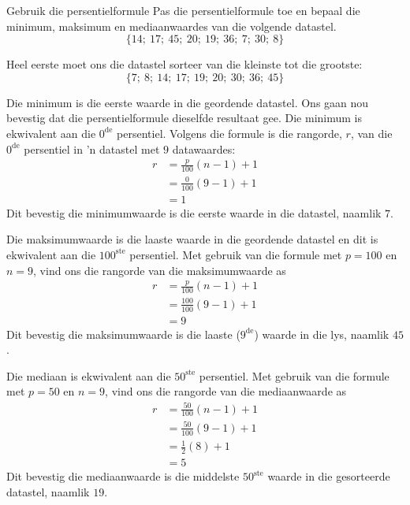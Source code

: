 \begin{wex}{Gebruik die persentielformule}
{Pas die persentielformule toe en bepaal die minimum, maksimum en mediaanwaardes van die volgende datastel. 
    \begin{equation*}
      \{14;\ 17;\ 45;\ 20;\ 19;\ 36;\ 7;\ 30;\ 8\}
    \end{equation*}
}{

  Heel eerste moet ons die datastel sorteer van die kleinste tot die grootste:
    \begin{equation*}
      \{7;\ 8;\ 14;\ 17;\ 19;\ 20;\ 30;\ 36;\ 45\}
    \end{equation*}


    Die minimum is die eerste waarde in die geordende datastel. Ons gaan nou bevestig dat die persentielformule dieselfde resultaat gee. Die minimum is ekwivalent aan die $0^{\mathrm{de}}$ persentiel. Volgens die formule is die rangorde, $r$, van die $0^{\mathrm{de}}$ persentiel in ’n datastel met $9$ datawaardes:
    \begin{align*}
      r &= \frac{p}{100}\left(n-1\right)+1 \\
        &= \frac{0}{100}\left(9-1\right)+1 \\
        &= 1
    \end{align*}
    Dit bevestig die minimumwaarde is die eerste waarde in die datastel, naamlik $7$.


    Die maksimumwaarde is die laaste waarde in die geordende datastel en dit is ekwivalent aan die $100^{\mathrm{ste}}$
    persentiel. Met gebruik van die formule met $p=100$ en $n=9$,
     vind ons die rangorde van die maksimumwaarde as
    \begin{align*}
      r &= \frac{p}{100}\left(n-1\right)+1 \\
        &= \frac{100}{100}\left(9-1\right)+1 \\
        &= 9
    \end{align*}
    Dit bevestig die maksimumwaarde is die laaste ($9^{\mathrm{de}}$) waarde in die lys, naamlik $45$.


    Die mediaan is ekwivalent aan die $50^{\mathrm{ste}}$ persentiel. Met gebruik van die formule met $p=50$ en $n=9$, vind ons die rangorde van die mediaanwaarde as
    \begin{align*}
      r &= \frac{50}{100}\left(n-1\right)+1 \\
        &= \frac{50}{100}\left(9-1\right)+1 \\
        &= \frac{1}{2}(8)+1 \\
        &= 5
    \end{align*}
    Dit bevestig die mediaanwaarde is die middelste $50^{\mathrm{ste}}$ waarde in die gesorteerde datastel, naamlik $19$. 
}
\end{wex}

